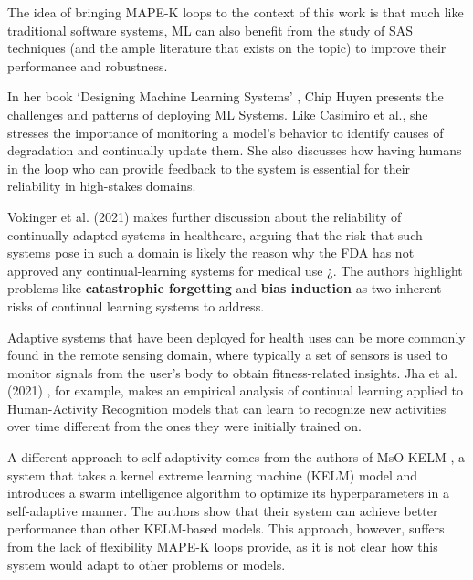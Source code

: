 \documentclass[../main.tex]{subfiles}
\begin{document}
    The idea of bringing MAPE-K loops to the context of this work is that much like traditional software systems, ML can also benefit from the study of SAS techniques (and the ample literature that exists on the topic) to improve their performance and robustness.

    In her book `Designing Machine Learning Systems' \cite{huyen_designing_2022}, Chip Huyen presents the challenges and patterns of deploying ML Systems. Like Casimiro et al., she stresses the importance of monitoring a model's behavior to identify causes of degradation and continually update them. She also discusses how having humans in the loop who can provide feedback to the system is essential for their reliability in high-stakes domains.

    Vokinger et al. (2021) makes further discussion about the reliability of continually-adapted systems in healthcare, arguing that the risk that such systems pose in such a domain is likely the reason why the FDA has not approved any continual-learning systems for medical use \cite{vokingerContinualLearningMedical2021} ¿. The authors highlight problems like \textbf{catastrophic forgetting} and \textbf{bias induction} as two inherent risks of continual learning systems to address.

    Adaptive systems that have been deployed for health uses can be more commonly found in the remote sensing domain, where typically a set of sensors is used to monitor signals from the user's body to obtain fitness-related insights. Jha et al. (2021) \cite{jhaContinualLearningSensorbased2021}, for example, makes an empirical analysis of continual learning applied to Human-Activity Recognition models that can learn to recognize new activities over time different from the ones they were initially trained on.
    
    A different approach to self-adaptivity comes from the authors of MsO-KELM \cite{haoTechnologyOrientedPathwayAuxiliary2022}, a system that takes a kernel extreme learning machine (KELM) model \cite{xiaEvolvingKernelExtreme2022} and introduces a swarm intelligence algorithm to optimize its hyperparameters in a self-adaptive manner. The authors show that their system can achieve better performance than other KELM-based models. This approach, however, suffers from the lack of flexibility MAPE-K loops provide, as it is not clear how this system would adapt to other problems or models.
    
\end{document}
